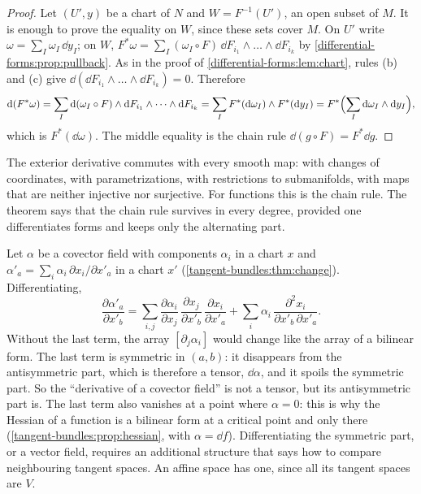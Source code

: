 \begin{notechapter}
\begin{proof}
Let $(U', y)$ be a chart of $N$ and $W = F^{-1}(U')$, an open subset of
$M$. It is enough to prove the equality on $W$, since these sets cover
$M$. On $U'$ write $\omega = \sum_I\omega_I\,\dd y_I$; on $W$,
$F^*\omega = \sum_I(\omega_I\circ F)\,\dd F_{i_1}\wedge\dots\wedge
\dd F_{i_k}$ by \cref{differential-forms:prop:pullback}. As in the proof
of \cref{differential-forms:lem:chart}, rules (b) and (c) give
$\dd(\dd F_{i_1}\wedge\dots\wedge\dd F_{i_k}) = 0$. Therefore
\[
  \mathrm{d}(F^*\omega)
  = \sum_I\mathrm{d}(\omega_I\circ F)\wedge\mathrm{d} F_{i_1}\wedge\dots\wedge
    \mathrm{d} F_{i_k}
  = \sum_IF^*(\mathrm{d}\omega_I)\wedge F^*(\mathrm{d} y_I)
  = F^*\Bigl(\sum_I\mathrm{d}\omega_I\wedge\mathrm{d} y_I\Bigr) ,
\]
which is $F^*(\dd\omega)$. The middle equality is the chain rule
$\dd(g\circ F) = F^*\dd g$.
\end{proof}

\begin{center}
\end{center}

\begin{keyidea}
The exterior derivative commutes with every smooth map: with changes of
coordinates, with parametrizations, with restrictions to submanifolds,
with maps that are neither injective nor surjective. For functions this
is the chain rule. The theorem says that the chain rule survives in
every degree, provided one differentiates forms and keeps only the
alternating part.
\end{keyidea}

\begin{remark}
\label{differential-forms:rem:symmetric}
Let $\alpha$ be a covector field with components $\alpha_i$ in a chart
$x$ and $\alpha'_a = \sum_i\alpha_i\,\partial x_i/\partial x'_a$ in a
chart $x'$ (\cref{tangent-bundles:thm:change}). Differentiating,
\[
  \frac{\partial\alpha'_a}{\partial x'_b}
  = \sum_{i,j}\frac{\partial\alpha_i}{\partial x_j}\,
    \frac{\partial x_j}{\partial x'_b}\,
    \frac{\partial x_i}{\partial x'_a}
  + \sum_i\alpha_i\,\frac{\partial^2x_i}{\partial x'_b\,\partial x'_a} .
\]
Without the last term, the array $[\partial_j\alpha_i]$ would change
like the array of a bilinear form. The last term is symmetric in
$(a, b)$: it disappears from the antisymmetric part, which is therefore
a tensor, $\dd\alpha$, and it spoils the symmetric part. So the
``derivative of a covector field'' is not a tensor, but its
antisymmetric part is. The last term also vanishes at a point where
$\alpha = 0$: this is why the Hessian of a function is a bilinear form
at a critical point and only there
(\cref{tangent-bundles:prop:hessian}, with $\alpha = \dd f$).
Differentiating the symmetric part, or a vector field, requires an
additional structure that says how to compare neighbouring tangent
spaces. An affine space has one, since all its tangent spaces are $V$.
\end{remark}


\end{notechapter}

